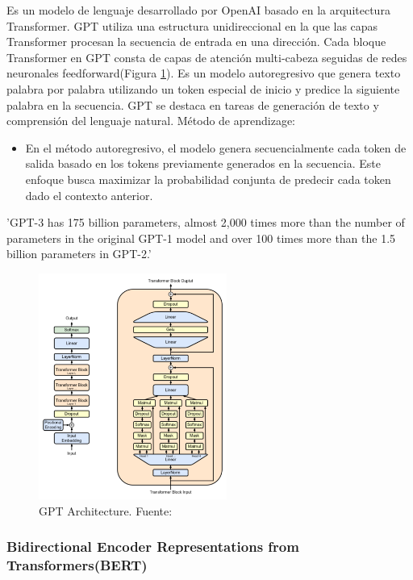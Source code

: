      Es un modelo de lenguaje desarrollado por OpenAI basado en la arquitectura Transformer. GPT utiliza una estructura unidireccional en la que las capas Transformer procesan la secuencia de entrada en una dirección. Cada bloque Transformer en GPT consta de capas de atención multi-cabeza seguidas de redes neuronales feedforward(Figura \ref{fig:gpt}). Es un modelo autoregresivo que genera texto palabra por palabra utilizando un token especial de inicio y predice la siguiente palabra en la secuencia. GPT se destaca en tareas de generación de texto y comprensión del lenguaje natural.
     Método de aprendizage:
     \begin{itemize}
         \item En el método autoregresivo, el modelo genera secuencialmente cada token de salida basado en los tokens previamente generados en la secuencia. Este enfoque busca maximizar la probabilidad conjunta de predecir cada token dado el contexto anterior.

     \end{itemize}
    'GPT-3 has 175 billion parameters, almost 2,000 times more than the number of parameters in the original GPT-1 model and over 100 times more than the 1.5 billion parameters in GPT-2.'\cite{gpt}
    \begin{figure}[h]
        \centering
        \includegraphics[width=0.55\textwidth]{plantilla-libro/img/gpt_architecture.png}
        \caption{GPT Architecture. Fuente: \cite{gpt-architecture}}
        \label{fig:gpt}
    \end{figure}
\newpage
\subsubsection{Bidirectional Encoder Representations from Transformers(BERT)}

